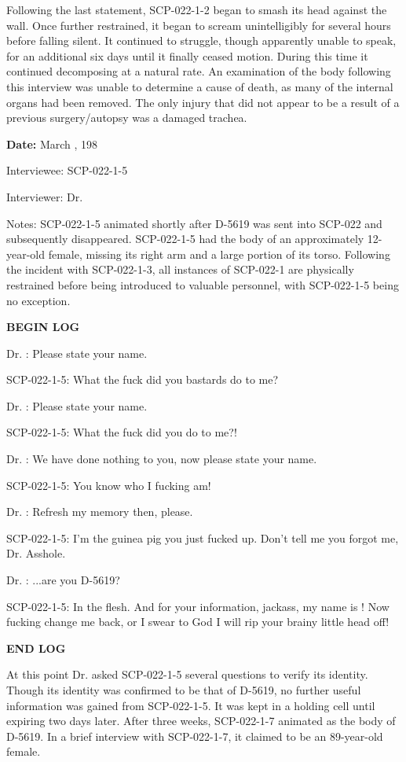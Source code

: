 Following the last statement, SCP-022-1-2 began to smash its head against the wall. Once further restrained, it began to scream unintelligibly for several hours before falling silent. It continued to struggle, though apparently unable to speak, for an additional six days until it finally ceased motion. During this time it continued decomposing at a natural rate. An examination of the body following this interview was unable to determine a cause of death, as many of the internal organs had been removed. The only injury that did not appear to be a result of a previous surgery/autopsy was a damaged trachea.

\textbf{Date:} March , 198

Interviewee: SCP-022-1-5

Interviewer: Dr. 

Notes: SCP-022-1-5 animated shortly after D-5619 was sent into SCP-022 and subsequently disappeared. SCP-022-1-5 had the body of an approximately 12-year-old female, missing its right arm and a large portion of its torso. Following the incident with SCP-022-1-3, all instances of SCP-022-1 are physically restrained before being introduced to valuable personnel, with SCP-022-1-5 being no exception.

\begin{leftbar}
\begin{flushleft}
\textbf{\lb BEGIN LOG\rb}

Dr. : Please state your name.

SCP-022-1-5: What the fuck did you bastards do to me?

Dr. : Please state your name.

SCP-022-1-5: What the fuck did you do to me?!

Dr. : We have done nothing to you, now please state your name.

SCP-022-1-5: You know who I fucking am!

Dr. : Refresh my memory then, please.

SCP-022-1-5: I'm the guinea pig you just fucked up. Don't tell me you forgot me, Dr. Asshole.

Dr. : ...are you D-5619?

SCP-022-1-5: In the flesh. And for your information, jackass, my name is \redacted! Now fucking change me back, or I swear to God I will rip your brainy little head off!

\textbf{\lb END LOG\rb}
\end{flushleft}
\end{leftbar}

At this point Dr.  asked SCP-022-1-5 several questions to verify its identity. Though its identity was confirmed to be that of D-5619, no further useful information was gained from SCP-022-1-5. It was kept in a holding cell until expiring two days later. After three weeks, SCP-022-1-7 animated as the body of D-5619. In a brief interview with SCP-022-1-7, it claimed to be an 89-year-old female.